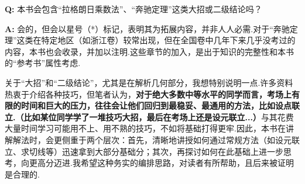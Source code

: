 {		\par\vspace{1cm}
		
		\noindent
		\textbf{Q: }本书会包含“拉格朗日乘数法”、“奔驰定理”这类大招或二级结论吗？
		\par\vspace{0.3cm}
		\noindent
		\textbf{A: }会的，但会以星号（*）标记，表明其为拓展内容，并非人人必需.对于“奔驰定理”这类在特定地区（如浙江卷）较常出现，但在全国卷中几年下来几乎没考过的内容，本书也会收录，并加以注明.这些章节的加入，是出于知识的完整性和本书的“参考书”属性考虑.
		\par\medskip 
		关于“大招”和“二级结论”，尤其是在解析几何部分，我想特别说明一点.许多资料热衷于介绍各种技巧，但笔者认为，\textbf{对于绝大多数中等水平的同学而言，考场上有限的时间和巨大的压力，往往会让他们回归到最稳妥、最通用的方法，比如设点联立.（比如某位同学学了一堆技巧大招，最后在考场上还是设元联立...）}与其花费大量时间学习可能用不上、用不熟的技巧，不如将基础打得更牢.因此，本书在讲解解法时，会更侧重于两个层次：首先，清晰地讲授如何通过常规方法（如设元联立、求切线等）迅速拿到大部分基础分；其次，再探讨如何在此基础上进一步思考，向更高分迈进.我希望这种务实的编排思路，对读者有所帮助，且后来被证明是合理的.
		
	} 